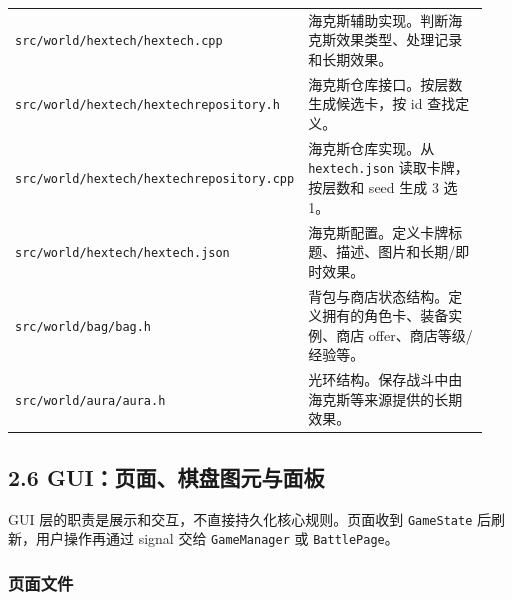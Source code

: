 \documentclass[UTF8,10pt]{ctexart}
\begin{document}
{\begin{longtable}{p{0.34\linewidth}p{0.60\linewidth}}
\texttt{src/\allowbreak{}world/\allowbreak{}hextech/\allowbreak{}hextech.\allowbreak{}cpp} & 海克斯辅助实现。判断海克斯效果类型、处理记录和长期效果。 \\
\texttt{src/\allowbreak{}world/\allowbreak{}hextech/\allowbreak{}hextechrepository.\allowbreak{}h} & 海克斯仓库接口。按层数生成候选卡，按 id 查找定义。 \\
\texttt{src/\allowbreak{}world/\allowbreak{}hextech/\allowbreak{}hextechrepository.\allowbreak{}cpp} & 海克斯仓库实现。从 \texttt{hextech.\allowbreak{}json} 读取卡牌，按层数和 seed 生成 3 选 1。 \\
\texttt{src/\allowbreak{}world/\allowbreak{}hextech/\allowbreak{}hextech.\allowbreak{}json} & 海克斯配置。定义卡牌标题、描述、图片和长期/即时效果。 \\
\texttt{src/\allowbreak{}world/\allowbreak{}bag/\allowbreak{}bag.\allowbreak{}h} & 背包与商店状态结构。定义拥有的角色卡、装备实例、商店 offer、商店等级/经验等。 \\
\texttt{src/\allowbreak{}world/\allowbreak{}aura/\allowbreak{}aura.\allowbreak{}h} & 光环结构。保存战斗中由海克斯等来源提供的长期效果。 \\
\bottomrule
\end{longtable}
}

\subsection*{2.6 GUI：页面、棋盘图元与面板}

GUI 层的职责是展示和交互，不直接持久化核心规则。页面收到 \texttt{GameState} 后刷新，用户操作再通过 signal 交给 \texttt{GameManager} 或 \texttt{BattlePage}。

\subsubsection*{页面文件}
\end{document}
